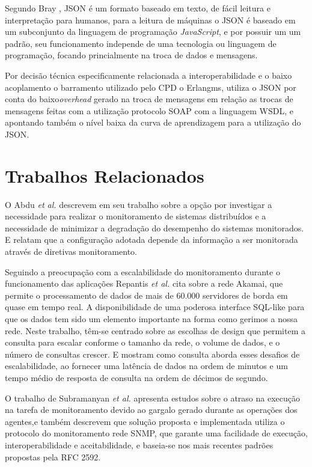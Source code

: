 Segundo Bray \cite{bray2017javascript}, \acrfull{JSON} é um formato baseado em texto, de fácil leitura e interpretação para humanos, para a leitura de máquinas o \acrshort{JSON} é baseado em um subconjunto da linguagem de programação \textit{JavaScript}, e por possuir um um padrão, seu funcionamento independe de uma tecnologia ou linguagem de programação, focando princialmente na troca de dados e mensagens.

Por decisão técnica especificamente relacionada a interoperabilidade e o baixo acoplamento o barramento utilizado pelo \acrshort{CPD} o Erlangms, utiliza o \acrshort{JSON} por conta do  baixo\textit{overhead} gerado na troca de mensagens em relação as trocas de mensagens feitas com a utilização protocolo \acrshort{SOAP} com a linguagem \acrshort{WSDL}, e apontando também o nível baixa da curva de aprendizagem para a utilização do \acrshort{JSON}.


\section{Trabalhos Relacionados}

O Abdu \textit{et al.} \cite{abdu1996monitoring} descrevem em seu trabalho sobre a opção por investigar a necessidade para realizar o monitoramento de sistemas distribuídos e a necessidade de minimizar a degradação do desempenho do sistemas monitorados. E relatam que a configuração adotada depende da informação a ser monitorada através de diretivas monitoramento.

Seguindo a preocupação com a escalabilidade do monitoramento durante o funcionamento das aplicações Repantis \textit{et al.} \cite{repantis2010scaling} cita sobre a rede Akamai, que permite o processamento de dados de mais de 60.000 servidores de borda em quase em tempo real. A disponibilidade de uma poderosa interface SQL-like para que os dados tem sido um elemento importante na forma como gerimos a nossa rede. Neste trabalho, têm-se centrado sobre as escolhas de design que permitem a consulta para escalar conforme o tamanho da rede, o volume de dados, e o número de consultas crescer. E mostram como consulta aborda esses desafios de escalabilidade, ao fornecer uma latência de dados na ordem de minutos e um tempo médio de resposta de consulta na ordem de décimos de segundo.

O trabalho de Subramanyan \textit{et al.} \cite{subramanyan2000scalable} apresenta estudos sobre o atraso na execução na tarefa de monitoramento devido ao gargalo gerado durante as operações dos agentes,e também descrevem que solução proposta e implementada utiliza o protocolo do monitoramento rede \acrshort{SNMP}, que garante uma facilidade de execução, interoperabilidade e aceitabilidade, e baseia-se nos mais recentes padrões propostas pela RFC 2592.  

